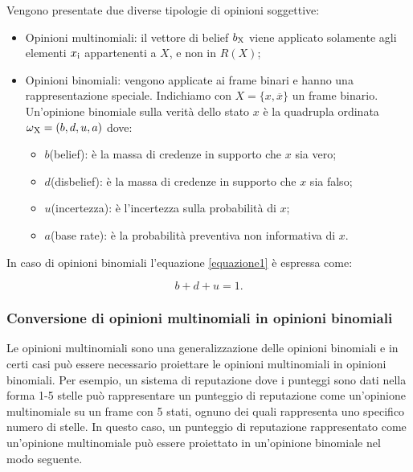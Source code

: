\documentclass{report}
\begin{document}
	Vengono presentate due diverse tipologie di opinioni soggettive:
	
	\begin{itemize}
		\item
		Opinioni multinomiali: il vettore di belief $b\textsubscript{X}$ viene
		applicato solamente agli elementi $x\textsubscript{i}$ appartenenti a $X$, e non in $R(X)$;
		\item
		Opinioni binomiali: vengono applicate ai frame binari e hanno una
		rappresentazione speciale. Indichiamo con $X = \{x,\overline{x}\}$ un frame
		binario. Un'opinione binomiale sulla verità dello stato $x$ è la
		quadrupla ordinata $\omega\textsubscript{X}=(b,d,u,a)$ dove:
		
		\begin{itemize}
			\item
			$b$(belief): è la massa di credenze in supporto che $x$ sia vero;
			\item
			$d$(disbelief): è la massa di credenze in supporto che $x$ sia falso;
			\item
			$u$(incertezza): è l'incertezza sulla probabilità di $x$;
			\item
			$a$(base rate): è la probabilità preventiva non informativa di $x$.
		\end{itemize}
	\end{itemize}
	
	In caso di opinioni binomiali l'equazione \eqref{equazione1} è espressa come:\\
	\begin{center}
	\begin{equation}
	b+d+u=1. \label{equazione3}
	\end{equation}
	
	\end{center}
	
	\hypertarget{header-n89}{%
		\subsubsection{Conversione di opinioni multinomiali in opinioni
			binomiali}\label{header-n89}}
	
	Le opinioni multinomiali sono una generalizzazione delle opinioni
	binomiali e in certi casi può essere necessario proiettare le opinioni
	multinomiali in opinioni binomiali. Per esempio, un sistema di
	reputazione dove i punteggi sono dati nella forma 1-5 stelle può
	rappresentare un punteggio di reputazione come un'opinione multinomiale
	su un frame con 5 stati, ognuno dei quali rappresenta uno specifico
	numero di stelle. In questo caso, un punteggio di reputazione
	rappresentato come un'opinione multinomiale può essere proiettato in
	un'opinione binomiale nel modo seguente.
	
\end{document}
